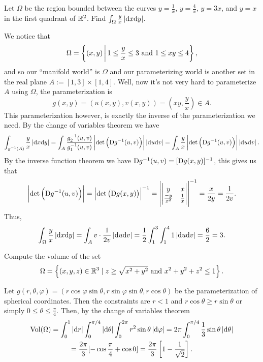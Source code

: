 \documentclass[11pt,a4paper]{article}
\begin{document}
\begin{exercise}
  Let $\Omega$ be the region bounded between the curves
  $y = \frac{1}{x}$, $y = \frac{4}{x}$, $y = 3x$, and $y = x$ in
  the first quadrant of $\mathbb{R}^2$.
  Find $\int_{\Omega} \frac{y}{x} \abs{\dx \dy}$.
\end{exercise}
\begin{solution}
  We notice that
  \[
    \Omega =
    \left\{(x,y) \,\middle\vert\, 1 \le \frac{y}{x} \le 3 \text{ and } 1 \le xy \le 4\right\},
  \]
  and so our ``manifold world'' is $\Omega$ and our parameterizing
  world is another set in the real plane $A := [1,3] \times [1,4]$.
  Well, now it's not very hard to parameterize $A$ using $\Omega$,
  the parameterization is
  \[
    g(x,y) = (u(x,y),v(x,y)) = (xy,\frac{y}{x}) \in A.
  \]
  This parameterization however, is exactly the inverse of the
  parameterization we need.
  By the change of variables theorem we have
  \[
    \int_{g^{-1}(A)} \frac{y}{x} \abs{\dx \dy} =
    \int_{A} \frac{g_2^{-1}(u,v)}{g_1^{-1}(u,v)}
      \abs{\det\del{\Dif g^{-1}(u,v)}} \abs{\du \dv} =
    \int_{A} \frac{y}{x}
      \abs{\det\del{\Dif g^{-1}(u,v)}} \abs{\du \dv}.
  \]
  By the inverse function theorem we have
  $\mathrm{D} g^{-1}(u,v) = [\mathrm{D} g(x,y)]^{-1}$,
  this gives us that
  \[
    \abs{\det\del{\Dif g^{-1}(u,v)}} =
    \abs{\det\del{\Dif g(x,y)}}^{-1} =
    \abs{\begin{vmatrix}
      y & x \\
      \frac{-y}{x^2} & \frac{1}{x}
    \end{vmatrix}}^{-1} = \frac{x}{2y} = \frac{1}{2v}.
  \]
  Thus,
  \[
    \int_{\Omega} \frac{y}{x} \abs{\dx \dy} =
    \int_{A} v \cdot \frac{1}{2v} \abs{\du \dv} =
    \half \int_{1}^{3} \int_{1}^{4} 1 \abs{\du \dv} =
    \frac{6}{2} = 3.
  \]
\end{solution}

\begin{exercise}
  Compute the volume of the set
  \[
    \Omega =
    \left\{(x,y,z) \in \mathbb{R}^3 \mid
      z \geq \sqrt{x^2 + y^2} \text{ and } x^2 + y^2 + z^2 \le 1\right\}.
  \]
\end{exercise}
\begin{solution}
  Let $g(r,\theta,\varphi) =
  (r \cos \varphi \sin \theta, r \sin \varphi \sin \theta, r \cos \theta)$
  be the parameterization of spherical coordinates.
  Then the constraints are $r < 1$ and
  $r \cos\theta \geq r \sin\theta$ or simply $0 \le \theta \le \frac{\pi}{4}$.
  Then, by the change of variables theorem
  \begin{multline*}
    \operatorname{Vol}(\Omega) =
    \int_{0}^{1} \left\lvert\mathrm{d} r\right\rvert \int_{0}^{\pi/4} \left\lvert\mathrm{d} \theta\right\rvert \int_{0}^{2\pi}
    r^2 \sin\theta \left\lvert\mathrm{d} \varphi\right\rvert =
    2\pi \int_{0}^{\pi/4} \frac{1}{3} \sin\theta \left\lvert\mathrm{d} \theta\right\rvert \\ =
    \frac{2\pi}{3} [-\cos\frac{\pi}{4} + \cos 0] =
    \frac{2\pi}{3} \left[1 - \frac{1}{\sqrt{2}}\right].
  \end{multline*}
\end{solution}
\end{document}
